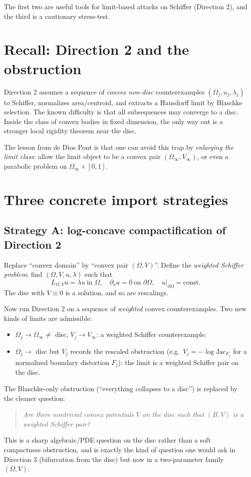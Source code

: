 \documentclass[11pt]{article}
\newcommand{\Om}{\Omega}
\newcommand{\1}{\mathbf 1}
\newcommand{\nor}{\partial_\nu}
\begin{document}
The first two are useful tools for limit-based attacks on Schiffer
(Direction 2), and the third is a cautionary stress-test.

\section*{Recall: Direction 2 and the obstruction}

Direction 2 assumes a sequence of \emph{convex non-disc} counterexamples
$(\Om_j,u_j,\lambda_j)$ to Schiffer, normalizes area/centroid, and
extracts a Hausdorff limit by Blaschke selection. The known difficulty
is that all subsequences may converge to a disc. Inside the class of
convex bodies in fixed dimension, the only way out is a stronger local
rigidity theorem near the disc.

The lesson from de Dios Pont is that one can avoid this trap by
\emph{enlarging the limit class}: allow the limit object to be a convex
pair $(\Om_\infty,V_\infty)$, or even a parabolic problem on
$\Om_\infty\times[0,1]$.

\section*{Three concrete import strategies}

\subsection*{Strategy A: log-concave compactification of Direction 2}

Replace ``convex domain'' by ``convex pair $(\Om,V)$''. Define the
\emph{weighted Schiffer problem}: find $(\Om,V,u,\lambda)$ such that
\[
    L_{\Om,V}u=\lambda u\ \text{in }\Om,\quad
    \nor u=0\ \text{on }\partial\Om,\quad
    u|_{\partial\Om}=\text{const}.
\]
The disc with $V\equiv 0$ is a solution, and so are rescalings.

Now run Direction 2 on a sequence of \emph{weighted} convex
counterexamples. Two new kinds of limits are admissible:
\begin{itemize}[leftmargin=*]
    \item $\Om_j\to\Om_\infty\ne$ disc, $V_j\to V_\infty$: a weighted
    Schiffer counterexample.
    \item $\Om_j\to$ disc but $V_j$ records the rescaled obstruction
    (e.g.\ $V_j=-\log\mathrm{Jac}_{F_j}$ for a normalized boundary
    distortion $F_j$): the limit is a weighted Schiffer pair on the disc.
\end{itemize}
The Blaschke-only obstruction (``everything collapses to a disc'') is
replaced by the cleaner question:
\begin{quote}
\emph{Are there nontrivial convex potentials $V$ on the disc such that
$(B,V)$ is a weighted Schiffer pair?}
\end{quote}
This is a sharp algebraic/PDE question on the disc rather than a soft
compactness obstruction, and is exactly the kind of question one would
ask in Direction 3 (bifurcation from the disc) but now in a
two-parameter family $(\Om,V)$.
\end{document}
